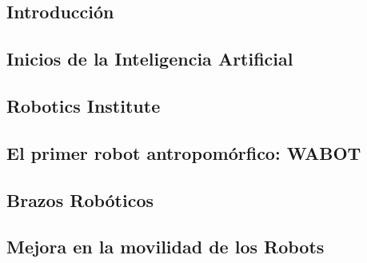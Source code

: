 \documentclass[a4paper,10pt]{article}
\begin{document}
\subsection{Introducción}


\subsection{Inicios de la Inteligencia Artificial}


\subsection{Robotics Institute}


\subsection{El primer robot antropomórfico: WABOT}


\subsection{Brazos Robóticos}


\subsection{Mejora en la movilidad de los Robots}


\normalsize


\onecolumn


\nocite{*}
\end{document}
